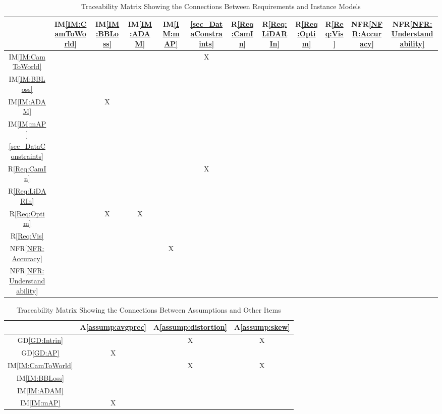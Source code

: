 \documentclass[12pt]{article}
\newcommand{\dref}[1]{GD\ref{#1}}
\newcommand{\aref}[1]{A\ref{#1}}
\newcommand{\iref}[1]{IM\ref{#1}}
\newcommand{\rref}[1]{R\ref{#1}}
\newcommand{\nfrref}[1]{NFR\ref{#1}}
\begin{document}
\begin{table}[h!]
\centering
\begin{tabular}{|c|c|c|c|c|c|c|c|c|c|c|c|}
\hline
	& \iref{IM:CamToWorld}& \iref{IM:BBLoss}& \iref{IM:ADAM}& \iref{IM:mAP}& \ref{sec_DataConstraints}& \rref{Req:CamIn}& \rref{Req:LiDARIn}& \rref{Req:Optim}& \rref{Req:Vis}& \nfrref{NFR:Accuracy}& \nfrref{NFR:Understandability} \\
\hline
\iref{IM:CamToWorld}             & & & & &X& & & & & & \\ \hline
\iref{IM:BBLoss}                 & & & & & & & & & & & \\ \hline
\iref{IM:ADAM}                   & &X& & & & & & & & & \\ \hline
\iref{IM:mAP}                    & & & & & & & & & & & \\ \hline
\ref{sec_DataConstraints}        & & & & & & & & & & & \\ \hline
\rref{Req:CamIn}                 & & & & &X& & & & & & \\ \hline
\rref{Req:LiDARIn}               & & & & & & & & & & & \\ \hline
\rref{Req:Optim}                 & &X&X& & & & & & & & \\ \hline
\rref{Req:Vis}                   & & & & & & & & & & & \\ \hline 
\nfrref{NFR:Accuracy}            & & & &X& & & & & & & \\ \hline
\nfrref{NFR:Understandability}   & & & & & & & & & & & \\
\hline
\end{tabular}
\caption{Traceability Matrix Showing the Connections Between Requirements and Instance Models}
\label{Table:R_trace}
\end{table}

\begin{table}[h!]
\centering
\begin{tabular}{|c|c|c|c|}
\hline
	& \aref{assump:avgprec} & \aref{assump:distortion}& \aref{assump:skew}\\
\hline
\dref{GD:Intrin}        & &X&X\\ \hline
\dref{GD:AP}            &X& & \\ \hline
\iref{IM:CamToWorld}    & &X&X\\ \hline
\iref{IM:BBLoss}        & & & \\ \hline
\iref{IM:ADAM}          & & & \\ \hline
\iref{IM:mAP}           &X& & \\ 
\hline
\end{tabular}
\caption{Traceability Matrix Showing the Connections Between Assumptions and Other Items}
\label{Table:A_trace}
\end{table}
\end{document}
